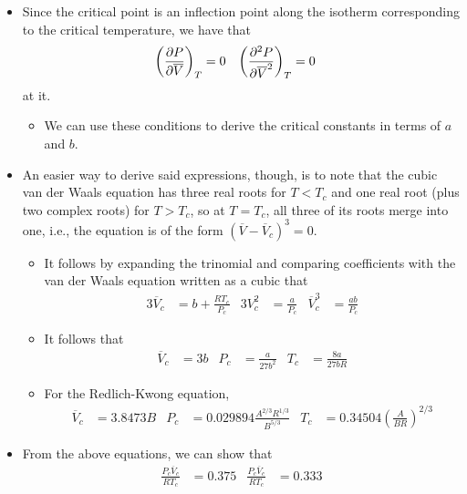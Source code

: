 \documentclass[../notes.tex]{subfiles}
\begin{document}
\begin{itemize}
\begin{itemize}
\begin{itemize}
        \end{itemize}
    \end{itemize}
    \item Since the critical point is an inflection point along the isotherm corresponding to the critical temperature, we have that
    \begin{align*}
        \left( \pdv{P}{\overline{V}} \right)_T &= 0&
        \left( \pdv[2]{P}{\overline{V}} \right)_T &= 0
    \end{align*}
    at it.
    \begin{itemize}
        \item We can use these conditions to derive the critical constants in terms of $a$ and $b$.
    \end{itemize}
    \item An easier way to derive said expressions, though, is to note that the cubic van der Waals equation has three real roots for $T<T_c$ and one real root (plus two complex roots) for $T>T_c$, so at $T=T_c$, all three of its roots merge into one, i.e., the equation is of the form $(\overline{V}-\overline{V}_c)^3=0$.
    \begin{itemize}
        \item It follows by expanding the trinomial and comparing coefficients with the van der Waals equation written as a cubic that
        \begin{align*}
            3\overline{V}_c &= b+\frac{RT_c}{P_c}&
            3V_c^2 &= \frac{a}{P_c}&
            \overline{V}_c^3 &= \frac{ab}{P_c}
        \end{align*}
        \item It follows that
        \begin{align*}
            \overline{V}_c &= 3b&
            P_c &= \frac{a}{27b^2}&
            T_c &= \frac{8a}{27bR}
        \end{align*}
        \item For the Redlich-Kwong equation,
        \begin{align*}
            \overline{V}_c &= 3.8473B&
            P_c &= 0.029894\frac{A^{2/3}R^{1/3}}{B^{5/3}}&
            T_c &= 0.34504\left( \frac{A}{BR} \right)^{2/3}
        \end{align*}
    \end{itemize}
    \item From the above equations, we can show that
    \begin{align*}
        \frac{P_c\overline{V}_c}{RT_c} &= 0.375&
        \frac{P_c\overline{V}_c}{RT_c} &= 0.333

\end{align*}
\end{itemize}
\end{document}

